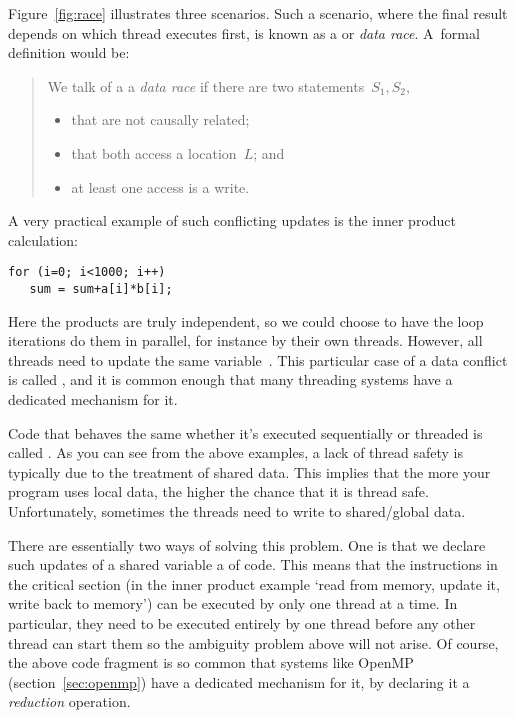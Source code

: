 Figure~\ref{fig:race} illustrates
three scenarios.
Such a scenario, where the final result depends on which thread
executes first, is known as a  or
\emph{data race}.
A~formal definition would be:
\begin{quotation}
  We talk of a a \emph{data race} if there are two statements~$S_1,S_2$,
  \begin{itemize}
  \item that are not causally related;
  \item that both access a location~$L$; and
  \item at least one access is a write.
  \end{itemize}
\end{quotation}

A very practical example of such conflicting updates is the inner
product calculation:
\begin{verbatim}
for (i=0; i<1000; i++)
   sum = sum+a[i]*b[i];
\end{verbatim}
Here the products are truly independent, so we could choose to have
the loop iterations do them in parallel, for instance by their own
threads. However, all threads need to update the same variable~.
This particular case of a data conflict is called ,
and it is common enough that many threading systems have a
dedicated mechanism for it.

Code that behaves the same whether it's executed
sequentially or threaded is called .
As you can see from the above examples, a lack of thread safety is
typically due to the treatment of shared data. This implies that
the more your program uses local data, the higher the chance
that it is thread safe. Unfortunately, sometimes the threads need
to write to shared/global data.

There are essentially two ways of solving this problem. 
One is that we declare such updates of a shared variable a
 of code. This means that the instructions
in the critical section (in the inner product example `read 
from memory, update it, write back to memory') can be executed by only
one thread at a time. In particular, they need to be executed
entirely by one thread before any other thread can start them so the
ambiguity problem above will not arise. Of course, the above code
fragment is so common that systems like OpenMP
(section~\ref{sec:openmp}) have a dedicated mechanism for it, by
declaring it a \emph{reduction}
operation.

